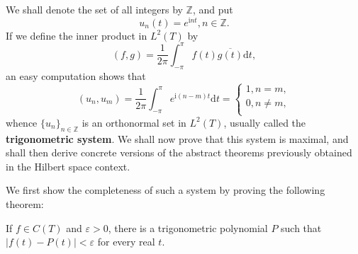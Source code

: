 We shall denote the set of all integers by $\mathbb{Z}$, and put 
$$
u_n\left( t \right) =e^{\mathrm{i}nt},n\in \mathbb{Z} .
$$
If we define the inner product in $L^2(T)$ by 
$$
\left( f,g \right) =\frac{1}{2\pi}\int_{-\pi}^{\pi}{f\left( t \right) \overline{g\left( t \right) }\mathrm{d}t},
$$
an easy computation shows that 
$$
\left( u_n,u_m \right) =\frac{1}{2\pi}\int_{-\pi}^{\pi}{e^{\mathrm{i}\left( n-m \right) t}\mathrm{d}t}=\begin{cases}
	1,n=m,\\
	0,n\ne m,\\
\end{cases}
$$
whence $\{u_n\}_{n\in\mathbb{Z}}$ is an orthonormal set in $L^2(T)$, usually called the \textbf{trigonometric system}. We shall now prove that this system is maximal, and shall then derive concrete versions of the abstract theorems previously obtained in the Hilbert space context.\par
We first show the completeness of such a system by proving the following theorem:
\begin{theorem}
If $f\in C(T)$ and $\varepsilon>0$, there is a trigonometric polynomial $P$ such that $|f(t)-P(t)|<\varepsilon$ for every real $t$.
\end{theorem}
